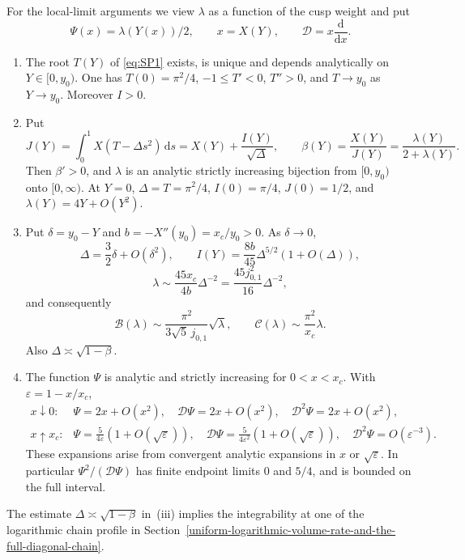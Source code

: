 For the local-limit arguments we view $\lambda$ as a function of the cusp
weight and put \[
 \Psi(x)=\lambda(Y(x))/2,\qquad x=X(Y),\qquad
 \mathscr D=x\frac{\mathrm{d}}{\mathrm{d}x}.
\]

\begin{lemma}\label{lem:parameter}
\begin{enumerate}[label=\textup{(\roman*)},leftmargin=*]
\item The root \(T(Y)\) of \eqref{eq:SP1} exists, is unique and depends
analytically on \(Y\in[0,y_0)\). One has \(T(0)=\pi^2/4\),
\(-1\le T'<0\), \(T''>0\), and \(T\to y_0\) as \(Y\to y_0\). Moreover
\(I>0\).
\item Put \begin{equation}
J(Y)=\int_0^1X(T-\Delta s^2)\,\mathrm{d}s
     =X(Y)+\frac{I(Y)}{\sqrt\Delta},
 \qquad
 \beta(Y)=\frac{X(Y)}{J(Y)}=
           \frac{\lambda(Y)}{2+\lambda(Y)}.
 \label{eq:SP11}
\end{equation} Then \(\beta'>0\), and \(\lambda\) is an analytic strictly
increasing bijection from \([0,y_0)\) onto \([0,\infty)\). At \(Y=0\),
\(\Delta=T=\pi^2/4\), \(I(0)=\pi/4\), \(J(0)=1/2\), and
\(\lambda(Y)=4Y+O(Y^2)\).
\item Put \(\delta=y_0-Y\) and \(b=-X''(y_0)=x_c/y_0>0\). As
\(\delta\to0\), \begin{equation}
\Delta=\frac32\delta+O(\delta^2),\qquad
 I(Y)=\frac{8b}{45}\Delta^{5/2}(1+O(\Delta)),
 \label{eq:SP13}
\end{equation} \begin{equation}
\lambda\sim\frac{45x_c}{4b}\Delta^{-2}
       =\frac{45j_{0,1}^2}{16}\Delta^{-2},
 \label{eq:SP14}
\end{equation} and consequently \begin{equation}
\mathcal B(\lambda)\sim
 \frac{\pi^2}{3\sqrt5\,j_{0,1}}\sqrt\lambda,\qquad
 \mathcal C(\lambda)\sim\frac{\pi^2}{x_c}\lambda.
 \label{eq:SP15}
\end{equation} Also \(\Delta\asymp\sqrt{1-\beta}\).
\item The function \(\Psi\) is analytic and strictly increasing for
\(0<x<x_c\). With \(\varepsilon=1-x/x_c\), \begin{equation}
\begin{array}{ll}
 x\downarrow0:&
 \Psi=2x+O(x^2),\quad\mathscr D\Psi=2x+O(x^2),\quad
 \mathscr D^2\Psi=2x+O(x^2),\\[1mm]
 x\uparrow x_c:&
 \displaystyle\Psi=\frac5{4\varepsilon}(1+O(\sqrt\varepsilon)),\quad
 \mathscr D\Psi=\frac5{4\varepsilon^2}(1+O(\sqrt\varepsilon)),\quad
 \mathscr D^2\Psi=O(\varepsilon^{-3}).
 \end{array}
 \label{eq:SP16}
\end{equation} These expansions arise from convergent analytic expansions
in \(x\) or \(\sqrt\varepsilon\). In particular \(\Psi^2/(\mathscr D\Psi)\)
has finite endpoint limits \(0\) and \(5/4\), and is bounded on the full
interval.
\end{enumerate}
\end{lemma}

The estimate \(\Delta\asymp\sqrt{1-\beta}\) in~(iii) implies the
integrability at one of the logarithmic chain profile in
Section~\ref{uniform-logarithmic-volume-rate-and-the-full-diagonal-chain}.
